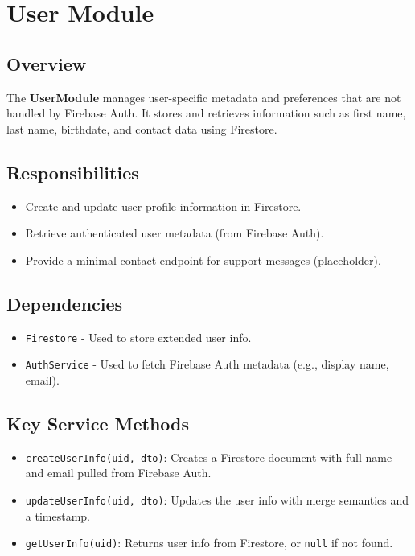 \section{User Module}

\subsection*{Overview}

The \textbf{UserModule} manages user-specific metadata and preferences that are not handled by Firebase Auth. It stores and retrieves information such as first name, last name, birthdate, and contact data using Firestore.

\subsection*{Responsibilities}

\begin{itemize}
    \item Create and update user profile information in Firestore.
    \item Retrieve authenticated user metadata (from Firebase Auth).
    \item Provide a minimal contact endpoint for support messages (placeholder).
\end{itemize}

\subsection*{Dependencies}

\begin{itemize}
    \item \texttt{Firestore} - Used to store extended user info.
    \item \texttt{AuthService} - Used to fetch Firebase Auth metadata (e.g., display name, email).
\end{itemize}

\subsection*{Key Service Methods}

\begin{itemize}
    \item \texttt{createUserInfo(uid, dto)}: Creates a Firestore document with full name and email pulled from Firebase Auth.
    \item \texttt{updateUserInfo(uid, dto)}: Updates the user info with merge semantics and a timestamp.
    \item \texttt{getUserInfo(uid)}: Returns user info from Firestore, or \texttt{null} if not found.
\end{itemize}

